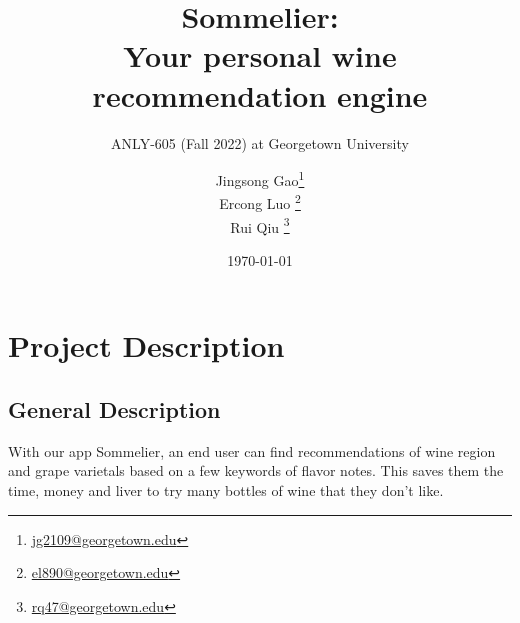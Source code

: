 \documentclass[
]{kaohandt}
\begin{document}

\title[]{Sommelier:\\ Your personal wine recommendation engine}
\subtitle{ANLY-605 (Fall 2022) at Georgetown University\sidenote{[Project step III updated.}}

\author[]{Jingsong Gao\thanks{\href{mailto:jg2109@georgetown.edu}{jg2109@georgetown.edu}}\\
Ercong Luo \thanks{\href{mailto:el890@georgetown.edu}{el890@georgetown.edu}}\\
Rui Qiu \thanks{\href{mailto:rq47@georgetown.edu}{rq47@georgetown.edu}}}

\date{\today}


\maketitle
\margintoc



\medskip


\section{Project Description}

\subsection*{General Description}

With our app Sommelier, an end user can find recommendations of wine region and grape varietals based on a few keywords of flavor notes. This saves them the time, money and liver to try many bottles of wine that they don’t like.
\end{document}
